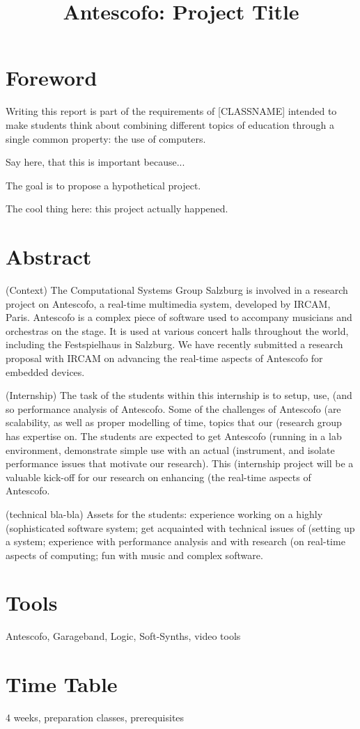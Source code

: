 \documentclass[onecolumn,nocopyrightspace,preprint]{sigplanconf}
\title{Antescofo: Project Title}
\begin{document}
\maketitle

\section*{Foreword} 
Writing this report is part of the requirements of [CLASSNAME] intended to
make students think about combining different topics of education through
a single common property: the use of computers.


Say here, that this is important because...

The goal is to propose a hypothetical project.

The cool thing here: this project actually happened.

\section*{Abstract} 

(Context) The Computational Systems Group Salzburg is involved in a research
project on Antescofo, a real-time multimedia system, developed by IRCAM,
Paris. Antescofo is a complex piece of software used to accompany musicians
and orchestras on the stage. It is used at various concert halls throughout
the world, including the Festspielhaus in Salzburg. We have recently submitted
a research proposal with IRCAM on advancing the real-time aspects of Antescofo
for embedded devices.

(Internship) The task of the students within this internship is to setup, use,
(and so performance analysis of Antescofo. Some of the challenges of Antescofo
(are scalability, as well as proper modelling of time, topics that our
(research group has expertise on. The students are expected to get Antescofo
(running in a lab environment, demonstrate simple use with an actual
(instrument, and isolate performance issues that motivate our research). This
(internship project will be a valuable kick-off for our research on enhancing
(the real-time aspects of Antescofo.

(technical bla-bla) Assets for the students: experience working on a highly
(sophisticated software system; get acquainted with technical issues of
(setting up a system; experience with performance analysis and with research
(on real-time aspects of computing; fun with music and complex software.

\section*{Tools}
Antescofo, Garageband, Logic, Soft-Synths, video tools


\section*{Time Table}

4 weeks, preparation classes, prerequisites
\end{document}
